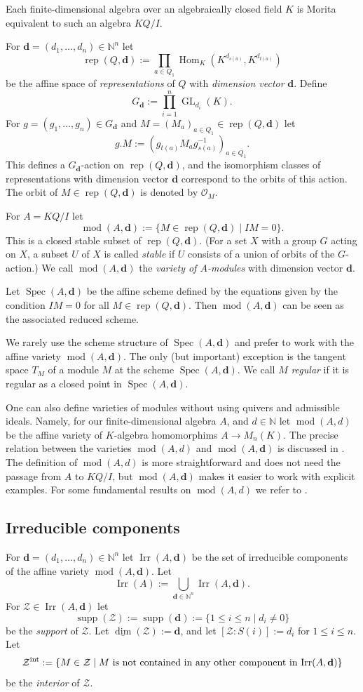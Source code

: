 \documentclass[12pt,reqno]{amsart}
\theoremstyle{definition}
\newcommand{\N}{\mathbb{N}}
\newcommand{\cO}{{\mathcal O}}
\newcommand{\bd}{\mathbf{d}}
\newcommand{\md}{\operatorname{mod}}
\newcommand{\rep}{\operatorname{rep}}
\newcommand{\Spec}{\operatorname{Spec}}
\newcommand{\dimv}{\underline{\dim}}
\newcommand{\supp}{\operatorname{supp}}
\newcommand{\Hom}{\operatorname{Hom}}
\newcommand{\irr}{\operatorname{Irr}}
\newcommand{\GL}{\operatorname{GL}}
\newcommand{\calZ}{\mathcal{Z}}
\begin{document}
Each finite-dimensional algebra over an algebraically closed field $K$
is Morita equivalent to such an algebra $KQ/I$.

For $\bd = (d_1,\ldots,d_n) \in \N^n$
let
$$
\rep(Q,\bd) :=
\prod_{a \in Q_1} \Hom_K(K^{d_{s(a)}},K^{d_{t(a)}})
$$
be the affine space of \emph{representations} of $Q$ with
\emph{dimension vector} $\bd$.
Define
$$
G_\bd := \prod_{i=1}^n \GL_{d_i}(K).
$$
For $g = (g_1,\ldots,g_n) \in G_\bd$ and
$M = (M_a)_{a \in Q_1} \in \rep(Q,\bd)$ let
$$
g.M := (g_{t(a)}M_ag_{s(a)}^{-1})_{a \in Q_1}.
$$
This defines a $G_\bd$-action on $\rep(Q,\bd)$, and the
isomorphism classes of representations with dimension vector
$\bd$ correspond to the orbits of this action.
The orbit of $M \in \rep(Q,\bd)$ is denoted by $\cO_M$.

For $A = KQ/I$ let
$$
\md(A,\bd) := \{ M \in \rep(Q,\bd) \mid IM = 0 \}.
$$
This is a  closed stable subset of $\rep(Q,\bd)$.
(For a set $X$ with a group $G$ acting on $X$,
a subset $U$ of $X$ is called \emph{stable} if $U$ consists of
a union of orbits of the $G$-action.)
We call $\md(A,\bd)$ the \emph{variety of $A$-modules} with dimension
vector $\bd$.

Let
$\Spec(A,\bd)$ be the affine scheme
defined by the equations given by the condition $IM = 0$ for all $M \in \rep(Q,\bd)$.
Then $\md(A,\bd)$ can be seen as the associated reduced scheme.

We rarely use the scheme structure of $\Spec(A,\bd)$
and prefer to work with the affine variety $\md(A,\bd)$.
The only (but important) exception is the tangent space
$T_M$ of a module $M$ at the scheme $\Spec(A,\bd)$.
We call $M$ \emph{regular} if it is regular
as a closed point in $\Spec(A,\bd)$.

One can also define varieties of modules without using quivers
and admissible ideals.
Namely, for our finite-dimensional algebra $A$, and $d \in \N$
let $\md(A,d)$ be the affine variety of $K$-algebra homomorphims
$A \to M_n(K)$.
The precise relation between the varieties $\md(A,d)$ and
$\md(A,\bd)$ is discussed in \cite{B91}.
The definition of $\md(A,d)$ is more straightforward and does not need the passage from $A$ to $KQ/I$, but $\md(A,\bd)$ makes it
easier to work with explicit examples.
For some fundamental results on $\md(A,d)$ we refer to
\cite{G74}.



\subsection{Irreducible components}\label{subsec:irreducible}
For $\bd = (d_1,\ldots,d_n) \in \N^n$
let $\irr(A,\bd)$ be the set of irreducible components of
the affine variety $\md(A,\bd)$.
Let
$$
\irr(A) := \bigcup_{\bd \in \N^n} \irr(A,\bd).
$$
For
$\calZ \in \irr(A,\bd)$ let
$$
\supp(\calZ) := \supp(\bd) := \{ 1 \le i \le n \mid d_i \not= 0 \}
$$
be the \emph{support} of $\calZ$.
Let $\dimv(\calZ) := \bd$, and let $[\calZ:S(i)] := d_i$ for
$1 \le i \le n$.
Let
$$
\calZ^{\rm int} := \{ M \in \calZ \mid M \text{ is not contained in any other
component in $\irr(A,\bd)$} \}
$$
be the \emph{interior} of $\calZ$.
\end{document}
